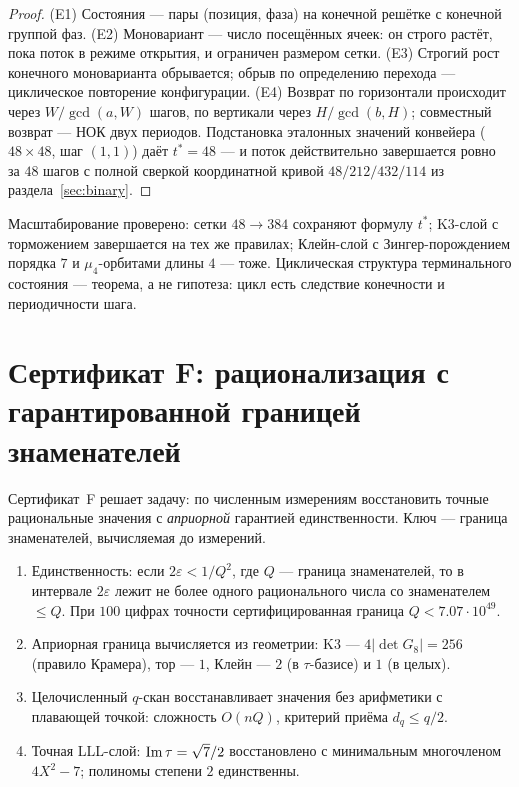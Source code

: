 \begin{proof}
(E1) Состояния — пары (позиция, фаза) на конечной решётке с конечной
группой фаз. (E2) Моновариант — число посещённых ячеек: он строго
растёт, пока поток в режиме открытия, и ограничен размером сетки.
(E3) Строгий рост конечного моноварианта обрывается; обрыв по
определению перехода — циклическое повторение конфигурации.
(E4) Возврат по горизонтали происходит через $W/\gcd(a,W)$ шагов,
по вертикали через $H/\gcd(b,H)$; совместный возврат — НОК двух
периодов. Подстановка эталонных значений конвейера ($48\times48$,
шаг $(1,1)$) даёт $t^*=48$ — и поток действительно завершается
ровно за $48$ шагов с полной сверкой координатной кривой
$48/212/432/114$ из раздела~\ref{sec:binary}.
\end{proof}

Масштабирование проверено: сетки $48\to384$ сохраняют формулу
$t^*$; K3-слой с торможением завершается на тех же правилах;
Клейн-слой с Зингер-порождением порядка $7$ и $\mu_4$-орбитами
длины $4$ — тоже. Циклическая структура терминального состояния —
теорема, а не гипотеза: цикл есть следствие конечности и
периодичности шага.

\section{Сертификат F: рационализация с гарантированной границей
знаменателей}\label{sec:certF}

Сертификат~F решает задачу: по численным измерениям восстановить
точные рациональные значения с \emph{априорной} гарантией
единственности. Ключ — граница знаменателей, вычисляемая до
измерений.

\begin{theorem}[F1--F4]\label{th:F}
\begin{enumerate}[leftmargin=2em, itemsep=0.15em]
\item[(F1)] Единственность: если $2\varepsilon<1/Q^2$, где $Q$ —
  граница знаменателей, то в интервале $2\varepsilon$ лежит не более
  одного рационального числа со знаменателем $\le Q$. При $100$
  цифрах точности сертифицированная граница $Q<7.07\cdot10^{49}$.
\item[(F2)] Априорная граница вычисляется из геометрии: K3 —
  $4|\det G_8|=256$ (правило Крамера), тор — $1$, Клейн — $2$
  (в $\tau$-базисе) и $1$ (в целых).
\item[(F3)] Целочисленный $q$-скан восстанавливает значения без
  арифметики с плавающей точкой: сложность $O(nQ)$, критерий приёма
  $d_q\le q/2$.
\item[(F4)] Точная LLL-слой: $\operatorname{Im}\tau=\sqrt7/2$ восстановлено с
  минимальным многочленом $4X^2-7$; полиномы степени $2$
  единственны.
\end{enumerate}
\end{theorem}

